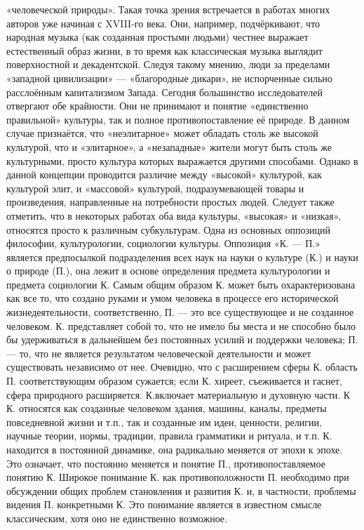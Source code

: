 \documentclass[12pt]{article}
\begin{document}
«человеческой природы». Такая точка зрения встречается в работах многих авторов уже начиная с XVIII-го
века. Они, например, подчёркивают, что народная музыка (как созданная простыми людьми) честнее выражает
естественный образ жизни, в то время как классическая музыка выглядит поверхностной и декадентской.
Следуя такому мнению, люди за пределами «западной цивилизации» — «благородные дикари», не испорченные
сильно расслоённым капитализмом Запада.
Сегодня большинство исследователей отвергают обе крайности. Они не принимают и понятие «единственно
правильной» культуры, так и полное противопоставление её природе. В данном случае признаётся, что
«неэлитарное» может обладать столь же высокой культурой, что и «элитарное», а «незападные» жители могут
быть столь же культурными, просто культура которых выражается другими способами. Однако в данной
концепции проводится различие между «высокой» культурой, как культурой элит, и «массовой» культурой,
подразумевающей товары и произведения, направленные на потребности простых людей. Следует также
отметить, что в некоторых работах оба вида культуры, «высокая» и «низкая», относятся просто к различным
субкультурам.
Одна из основных оппозиций философии, культурологии, социологии культуры. Оппозиция «К. — П.» является
предпосылкой подразделения всех наук на науки о культуре (К.) и науки о природе (П.), она лежит в основе
определения предмета культурологии и предмета социологии К. Самым общим образом К. может быть
охарактеризована как все то, что создано руками и умом человека в процессе его исторической
жизнедеятельности, соответственно, П. — это все существующее и не созданное человеком. К. представляет
собой то, что не имело бы места и не способно было бы удерживаться в дальнейшем без постоянных усилий и
поддержки человека; П. — то, что не является результатом человеческой деятельности и может существовать
независимо от нее. Очевидно, что с расширением сферы К. область П. соответствующим образом сужается;
если К. хиреет, съеживается и гаснет, сфера природного расширяется.
К.включает материальную и духовную части. К К. относятся как созданные человеком здания, машины, каналы,
предметы повседневной жизни и т.п., так и созданные им идеи, ценности, религии, научные теории, нормы,
традиции, правила грамматики и ритуала, и т.п. К. находится в постоянной динамике, она радикально меняется
от эпохи к эпохе. Это означает, что постоянно меняется и понятие П., противопоставляемое понятию К. 
Широкое понимание К. как противоположности П. необходимо при обсуждении общих проблем становления и
развития К. и, в частности, проблемы видения П. конкретными К. Это понимание является в известном смысле
классическим, хотя оно не единственно возможное.
\end{document}

